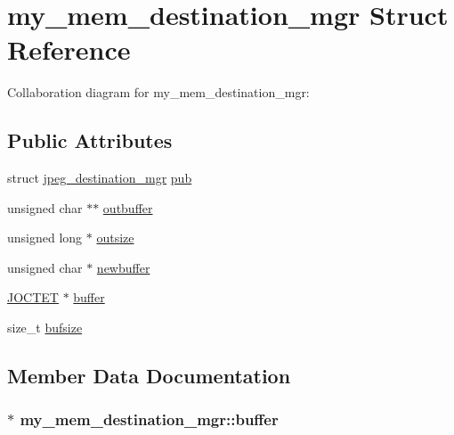 \hypertarget{structmy__mem__destination__mgr}{}\section{my\+\_\+mem\+\_\+destination\+\_\+mgr Struct Reference}
\label{structmy__mem__destination__mgr}


Collaboration diagram for my\+\_\+mem\+\_\+destination\+\_\+mgr\+:
\subsection*{Public Attributes}
\begin{DoxyCompactItemize}
\item 
struct \hyperlink{structjpeg__destination__mgr}{jpeg\+\_\+destination\+\_\+mgr} \hyperlink{structmy__mem__destination__mgr_a5e0cd1a96147d183b7338007a7716961}{pub}
\item 
unsigned char $\ast$$\ast$ \hyperlink{structmy__mem__destination__mgr_a61dceebdaf153d422514527aa0e1bf6e}{outbuffer}
\item 
unsigned long $\ast$ \hyperlink{structmy__mem__destination__mgr_ac4bcefbee84e8b603a57dbb347cc2351}{outsize}
\item 
unsigned char $\ast$ \hyperlink{structmy__mem__destination__mgr_ac0b918872c851937dd8751d1a8105220}{newbuffer}
\item 
\hyperlink{jmorecfg_8h_a356ad249f20e691b520da439f92cccbc}{J\+O\+C\+T\+E\+T} $\ast$ \hyperlink{structmy__mem__destination__mgr_a183510a848f0a8d421a541df6ce6acac}{buffer}
\item 
size\+\_\+t \hyperlink{structmy__mem__destination__mgr_a216685d583a991f4757f4e3f6a5de675}{bufsize}
\end{DoxyCompactItemize}


\subsection{Member Data Documentation}
\hypertarget{structmy__mem__destination__mgr_a183510a848f0a8d421a541df6ce6acac}{}
\subsubsection[{buffer}]{$\ast$ my\+\_\+mem\+\_\+destination\+\_\+mgr\+::buffer}\label{structmy__mem__destination__mgr_a183510a848f0a8d421a541df6ce6acac}
\hypertarget{structmy__mem__destination__mgr_a216685d583a991f4757f4e3f6a5de675}{}
